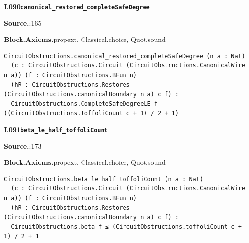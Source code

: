 \par\medskip\noindent\begin{minipage}{\textwidth}
{\small\bfseries L090\enspace\texttt{canonical\_restored\_completeSafeDegree}\par}
{\footnotesize\raggedright\textbf{Source.}\enspace{}:165\par
\textbf{Block.}\quad\textbf{Axioms.}\enspace propext, Classical.choice, Quot.sound\par}\nopagebreak
\begin{lstlisting}
CircuitObstructions.canonical_restored_completeSafeDegree (n a : Nat)
  (c : CircuitObstructions.Circuit (CircuitObstructions.CanonicalWire n a)) (f : CircuitObstructions.BFun n)
  (hR : CircuitObstructions.Restores (CircuitObstructions.canonicalBoundary n a) c f) :
  CircuitObstructions.CompleteSafeDegreeLE f ((CircuitObstructions.toffoliCount c + 1) / 2 + 1)
\end{lstlisting}
\end{minipage}\par

\par\medskip\noindent\begin{minipage}{\textwidth}
{\small\bfseries L091\enspace\texttt{beta\_le\_half\_toffoliCount}\par}
{\footnotesize\raggedright\textbf{Source.}\enspace{}:173\par
\textbf{Block.}\quad\textbf{Axioms.}\enspace propext, Classical.choice, Quot.sound\par}\nopagebreak
\begin{lstlisting}
CircuitObstructions.beta_le_half_toffoliCount (n a : Nat)
  (c : CircuitObstructions.Circuit (CircuitObstructions.CanonicalWire n a)) (f : CircuitObstructions.BFun n)
  (hR : CircuitObstructions.Restores (CircuitObstructions.canonicalBoundary n a) c f) :
  CircuitObstructions.beta f ≤ (CircuitObstructions.toffoliCount c + 1) / 2 + 1
\end{lstlisting}
\end{minipage}\par

